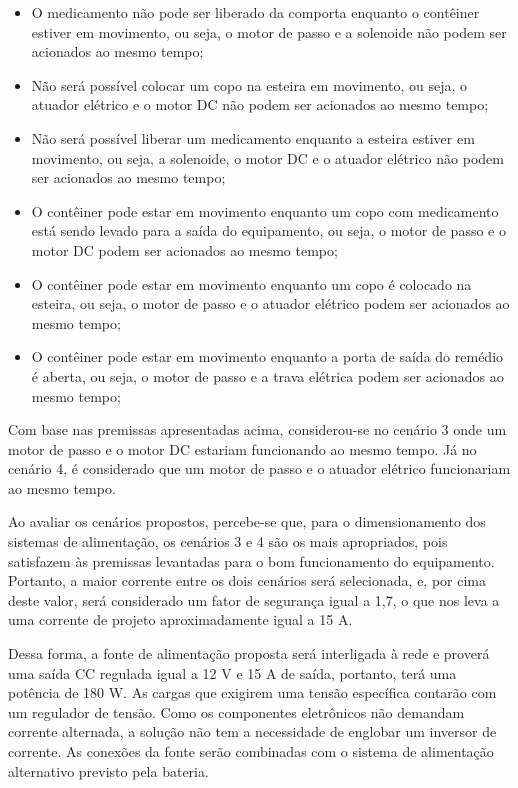     \begin{itemize}
        
        \item O medicamento não pode ser liberado da comporta enquanto o contêiner estiver em movimento, ou seja, o motor de passo e a solenoide não podem ser acionados ao mesmo tempo;
        
        \item Não será possível colocar um copo na esteira em movimento, ou seja, o atuador elétrico e o motor DC não podem ser acionados ao mesmo tempo;
        
        \item Não será possível liberar um medicamento enquanto a esteira estiver em movimento, ou seja, a solenoide, o motor DC e o atuador elétrico não podem ser acionados ao mesmo tempo;
        
        \item O contêiner pode estar em movimento enquanto um copo com medicamento está sendo levado para a saída do equipamento, ou seja, o motor de passo e o motor DC podem ser acionados ao mesmo tempo;
        
        \item O contêiner pode estar em movimento enquanto um copo é colocado na esteira, ou seja, o motor de passo e o atuador elétrico podem ser acionados ao mesmo tempo;
        
        \item O contêiner pode estar em movimento enquanto a porta de saída do remédio é aberta, ou seja, o motor de passo e a trava elétrica podem ser acionados ao mesmo tempo;

    \end{itemize}

Com base nas premissas apresentadas acima, considerou-se no cenário 3 onde um motor de passo e o motor DC estariam funcionando ao mesmo tempo. Já no cenário 4, é considerado que um motor de passo e o atuador elétrico funcionariam ao mesmo tempo.

Ao avaliar os cenários propostos, percebe-se que, para o dimensionamento dos sistemas de alimentação, os cenários 3 e 4 são os mais apropriados, pois satisfazem às premissas levantadas para o bom funcionamento do equipamento. Portanto, a maior corrente entre os dois cenários será selecionada, e, por cima deste valor, será considerado um fator de segurança igual a 1,7, o que nos leva a uma corrente de projeto aproximadamente igual a 15 A.

Dessa forma, a fonte de alimentação proposta será interligada à rede e proverá uma saída CC regulada igual a 12 V e 15 A de saída, portanto, terá uma potência de 180 W. As cargas que exigirem uma tensão específica contarão com um regulador de tensão. Como os componentes eletrônicos não demandam corrente alternada, a solução não tem a necessidade de englobar um inversor de corrente. As conexões da fonte serão combinadas com o sistema de alimentação alternativo previsto pela bateria. 

